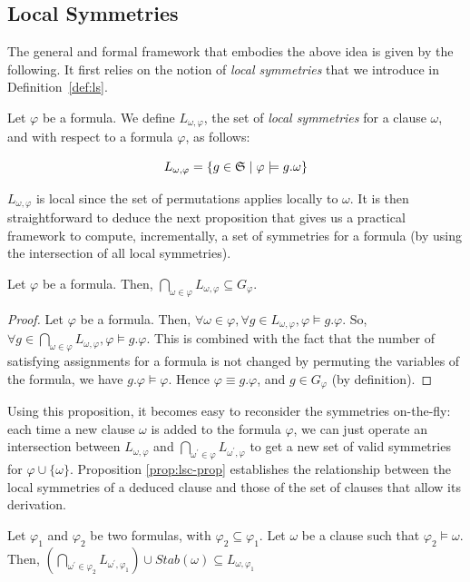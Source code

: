 \subsection{Local Symmetries}
The general and formal framework that embodies the above idea is given by the following. It first relies on the notion of \textit{local symmetries} that we introduce in Definition~\ref{def:ls}.
\begin{definition}
 \label{def:ls}
 Let $\varphi$ be a formula. We define $L_{\omega,\varphi}$, 
 the set of \textit{local symmetries} for a clause $\omega$, and with respect to 
 a formula $\varphi$, as follows:
 
 $$L_{\omega,\varphi}=\{g \in \mathfrak{S} \mid \varphi \models g.\omega\}$$
\end{definition}
$L_{\omega,\varphi}$ is local since the set of permutations applies locally to
$\omega$. It is then straightforward to deduce the next proposition that gives us a
practical framework to compute, incrementally, a set of symmetries for a
formula (by using the intersection of all local symmetries).
\begin{proposition}
 \label{prop:gls-prop}
 Let $\varphi$ be a formula. Then,  $\underset{\omega \in \varphi}{\bigcap}L_{\omega,\varphi} 
 \subseteq G_{\varphi}$.
\end{proposition}
\begin{proof}
 Let $\varphi$ be a formula. Then, $\forall \omega \in \varphi, \forall g \in L_{\omega,\varphi}, \varphi \models g.\varphi $. So, $\forall g \in \underset{\omega \in \varphi}{\bigcap}L_{\omega,\varphi}, \varphi \models g.\varphi$. This is combined with the fact that the number of satisfying assignments for a formula is not changed by permuting the variables of the formula, we have $g.\varphi \models \varphi$. Hence $\varphi \equiv g.\varphi$, and $g \in G_{\varphi}$ (by definition). 
\end{proof}
Using this proposition, it becomes easy to reconsider the symmetries
on-the-fly: each time a new clause $\omega$ is added to the formula $\varphi$,
we can just operate an intersection between $L_{\omega,\varphi}$ and
$\underset{\omega^\prime \in \varphi}{\bigcap}L_{\omega^\prime,\varphi}$ to get
a new set of valid symmetries for $\varphi \cup \{\omega\}$.
\medskip
Proposition \ref{prop:lsc-prop} establishes the relationship between the local symmetries of a deduced clause and those of the set of clauses that allow its derivation. 
\begin{proposition}
 \label{prop:lsc-prop}
 Let $\varphi_1$ and $\varphi_2$ be two formulas, with $\varphi_2 \subseteq \varphi_1$. 
 Let $\omega$ be a clause such that $\varphi_2 \models \omega$. Then, 
 $(\underset{\omega^\prime \in \varphi_2}{\bigcap}L_{\omega^\prime,\varphi_1})
 \cup Stab(\omega) \subseteq L_{\omega,\varphi_1}$
\end{proposition} 
